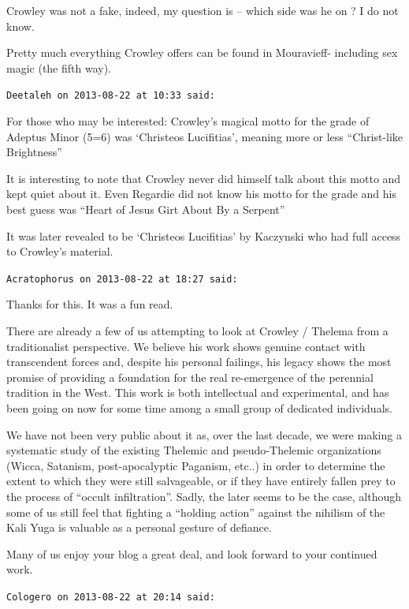 \begin{footnotesize}
\begin{sffamily}
Crowley was not a fake, indeed, my question is -- which side was he on ? I do not know.

Pretty much everything Crowley offers can be found in Mouravieff- including sex magic (the fifth way).

\hfill

\texttt{Deetaleh on 2013-08-22 at 10:33 said:}

For those who may be interested: Crowley's magical motto for the grade of Adeptus Minor (5=6) was `Christeos Lucifitias', meaning more or less ``Christ-like Brightness''

It is interesting to note that Crowley never did himself talk about this motto and kept quiet about it. Even Regardie did not know his motto for the grade and his best guess was ``Heart of Jesus Girt About By a Serpent''

It was later revealed to be `Christeos Lucifitias' by Kaczynski who had full access to Crowley's material.

\hfill

\texttt{Acratophorus on 2013-08-22 at 18:27 said:}

Thanks for this. It was a fun read.

There are already a few of us attempting to look at Crowley / Thelema from a traditionalist perspective. We believe his work shows genuine contact with transcendent forces and, despite his personal failings, his legacy shows the most promise of providing a foundation for the real re-emergence of the perennial tradition in the West. This work is both intellectual and experimental, and has been going on now for some time among a small group of dedicated individuals.

We have not been very public about it as, over the last decade, we were making a systematic study of the existing Thelemic and pseudo-Thelemic organizations (Wicca, Satanism, post-apocalyptic Paganism, etc..) in order to determine the extent to which they were still salvageable, or if they have entirely fallen prey to the process of ``occult infiltration''. Sadly, the later seems to be the case, although some of us still feel that fighting a ``holding action'' against the nihilism of the Kali Yuga is valuable as a personal gesture of defiance.

Many of us enjoy your blog a great deal, and look forward to your continued work.

\hfill

\texttt{Cologero on 2013-08-22 at 20:14 said:}


\end{sffamily}
\end{footnotesize}
